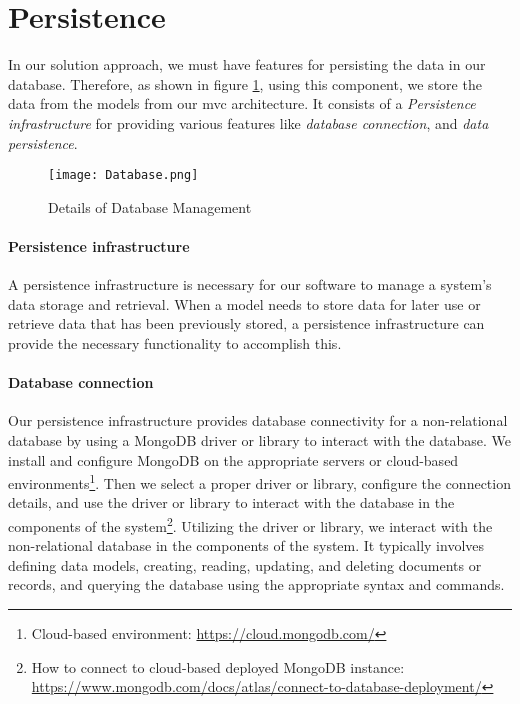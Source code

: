 \clearpage
\section{Persistence}
\label{sc:section:persistance}
In our solution approach, we must have features for persisting the data in our database.
Therefore, as shown in figure \ref{fig:sc:database}, using this component, we store the data from the models from our \ac{mvc} architecture.
It consists of a \textit{Persistence infrastructure} for providing various features like \textit{database connection}, and \textit{data persistence}.

\begin{figure}[htbp!]
    \centering    
    \texttt{[image: Database.png]} 
    \caption[Details of Database management]{Details of Database Management}
    \label{fig:sc:database}
\end{figure}

\paragraph{Persistence infrastructure}
A persistence infrastructure is necessary for our software to manage a system's data storage and retrieval. 
When a model needs to store data for later use or retrieve data that has been previously stored, a persistence infrastructure can provide the necessary functionality to accomplish this.

\paragraph{Database connection}
Our persistence infrastructure provides database connectivity for a non-relational database by using a MongoDB driver or library to interact with the database. 
We install and configure MongoDB on the appropriate servers or cloud-based environments\footnote{Cloud-based environment: \url{https://cloud.mongodb.com/}}.
Then we select a proper driver or library, configure the connection details, and use the driver or library to interact with the database in the components of the system\footnote{How to connect to cloud-based deployed MongoDB instance: \url{https://www.mongodb.com/docs/atlas/connect-to-database-deployment/}}.
Utilizing the driver or library, we interact with the non-relational database in the components of the system. It typically involves defining data models, creating, reading, updating, and deleting documents or records, and querying the database using the appropriate syntax and commands.

